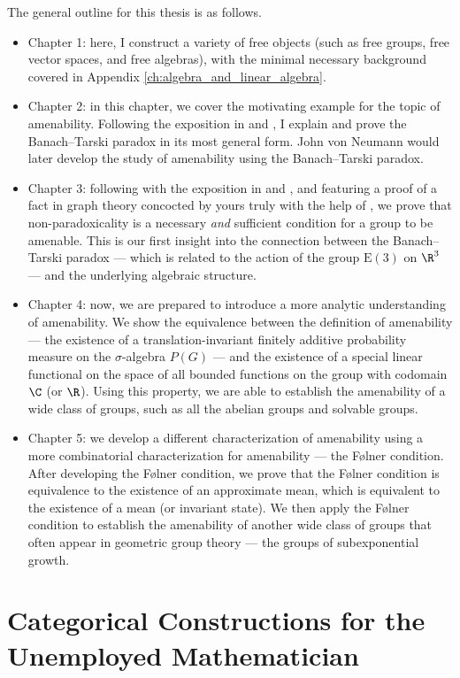 \documentclass[10pt]{package2}
\begin{document}
The general outline for this thesis is as follows.
\begin{itemize}
  \item Chapter 1: here, I construct a variety of free objects (such as free groups, free vector spaces, and free algebras), with the minimal necessary background covered in Appendix \ref{ch:algebra_and_linear_algebra}.
  \item Chapter 2: in this chapter, we cover the motivating example for the topic of amenability. Following the exposition in \cite{lectures_on_amenability} and \cite{amenable_banach_algebras}, I explain and prove the Banach--Tarski paradox in its most general form. John von Neumann would later develop the study of amenability using the Banach--Tarski paradox.
  \item Chapter 3: following with the exposition in \cite{lectures_on_amenability} and \cite{amenable_banach_algebras}, and featuring a proof of a fact in graph theory concocted by yours truly with the help of \cite{marshall_hall_thm}, we prove that non-paradoxicality is a necessary \textit{and} sufficient condition for a group to be amenable. This is our first insight into the connection between the Banach--Tarski paradox --- which is related to the action of the group $\text{E}(3)$ on $\R^3$ --- and the underlying algebraic structure.
  \item Chapter 4: now, we are prepared to introduce a more analytic understanding of amenability. We show the equivalence between the definition of amenability --- the existence of a translation-invariant finitely additive probability measure on the $\sigma$-algebra $P(G)$ --- and the existence of a special linear functional on the space of all bounded functions on the group with codomain $\C$ (or $\R$). Using this property, we are able to establish the amenability of a wide class of groups, such as all the abelian groups and solvable groups.
  \item Chapter 5: we develop a different characterization of amenability using a more combinatorial characterization for amenability --- the Følner condition. After developing the Følner condition, we prove that the Følner condition is equivalence to the existence of an approximate mean, which is equivalent to the existence of a mean (or invariant state). We then apply the Følner condition to establish the amenability of another wide class of groups that often appear in geometric group theory --- the groups of subexponential growth.
\end{itemize}
\chapter{Categorical Constructions for the Unemployed Mathematician}\label{ch:categorical_constructions}

\end{document}
